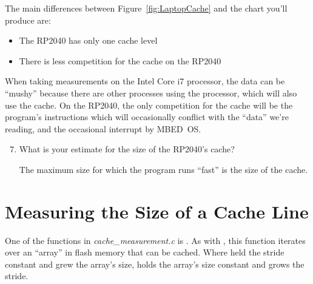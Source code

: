 The main differences between Figure~\ref{fig:LaptopCache} and the chart you'll produce are:

\begin{itemize}
    \item The RP2040 has only one cache level
    \item There is less competition for the cache on the RP2040
\end{itemize}

When taking measurements on the Intel Core i7 processor, the data can be ``mushy'' because there are other processes using the processor, which will also use the cache.
On the RP2040, the only competition for the cache will be the program's instructions which will occasionally conflict with the ``data'' we're reading,
and the occasional interrupt by MBED~OS\@.

\begin{description}
\end{description}

\begin{enumerate}
    \setcounter{enumi}{6}

    \item What is your estimate for the size of the RP2040's cache?

        The maximum size for which the program runs ``fast'' is the size of the cache.
\end{enumerate}


\section{Measuring the Size of a Cache Line}

One of the functions in \textit{cache\_measurement.c} is .
As with , this function iterates over an ``array'' in flash memory that can be cached.
Where  held the stride constant and grew the array's size,
 holds the array's size constant and grows the stride.

